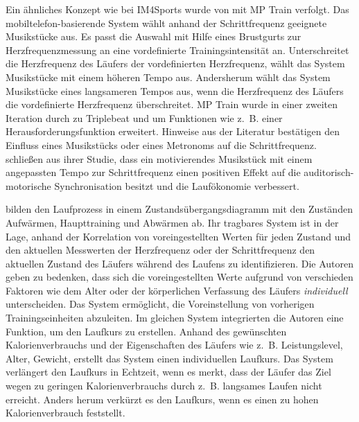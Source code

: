 Ein ähnliches Konzept wie bei IM4Sports wurde von \citet{Oliver2006} mit MP Train verfolgt. Das mobiltelefon-basierende System wählt anhand der Schrittfrequenz geeignete Musikstücke aus. Es passt die Auswahl mit Hilfe eines Brustgurts zur Herzfrequenzmessung an eine vordefinierte Trainingsintensität an. Unterschreitet die Herzfrequenz des Läufers der vordefinierten Herzfrequenz, wählt das System Musikstücke mit einem höheren Tempo aus. Andersherum wählt das System Musikstücke eines langsameren Tempos aus, wenn die Herzfrequenz des Läufers die vordefinierte Herzfrequenz überschreitet. MP Train wurde in einer zweiten Iteration durch \citet{DeOliveira2008} zu Triplebeat und um Funktionen wie z.~B. einer Herausforderungsfunktion erweitert. Hinweise aus der Literatur \citep{Bood2013} bestätigen den Einfluss eines Musikstücks oder eines Metronoms auf die Schrittfrequenz. \citet{Bood2013} schließen aus ihrer Studie, dass ein motivierendes Musikstück mit einem angepassten Tempo zur Schrittfrequenz einen positiven Effekt auf die auditorisch-motorische Synchronisation besitzt und die Laufökonomie verbessert.

\citet{Takata2007} bilden den Laufprozess in einem Zustandsübergangsdiagramm mit den Zuständen Aufwärmen, Haupttraining und Abwärmen ab. Ihr tragbares System ist in der Lage, anhand der Korrelation von voreingestellten Werten für jeden Zustand und den aktuellen Messwerten der Herzfrequenz oder der Schrittfrequenz den aktuellen Zustand des Läufers während des Laufens zu identifizieren. Die Autoren geben zu bedenken, dass sich die voreingestellten Werte aufgrund von verschieden Faktoren wie dem Alter oder der körperlichen Verfassung des Läufers \emph{individuell} unterscheiden. Das System ermöglicht, die Voreinstellung von vorherigen Trainingseinheiten abzuleiten. Im gleichen System integrierten die Autoren eine Funktion, um den Laufkurs zu erstellen. Anhand des gewünschten Kalorienverbrauchs und der Eigenschaften des Läufers wie z.~B. Leistungslevel, Alter, Gewicht, erstellt das System einen individuellen Laufkurs. Das System verlängert den Laufkurs in Echtzeit, wenn es merkt, dass der Läufer das Ziel wegen zu geringen Kalorienverbrauchs durch z.~B. langsames Laufen nicht erreicht. Anders herum verkürzt es den Laufkurs, wenn es einen zu hohen Kalorienverbrauch feststellt.

